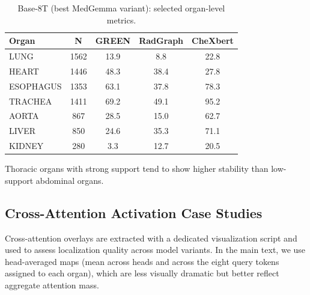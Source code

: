 \begin{table}[htbp]
    \centering
    \caption{Base-8T (best MedGemma variant): selected organ-level metrics.}
    \label{tab:best_model_organs}
    \begin{tabular}{lcccc}
        \toprule
        \textbf{Organ} & \textbf{N} & \textbf{GREEN} & \textbf{RadGraph} & \textbf{CheXbert} \\\midrule
        LUNG & 1562 & 13.9 & 8.8 & 22.8 \\
        HEART & 1446 & 48.3 & 38.4 & 27.8 \\
        ESOPHAGUS & 1353 & 63.1 & 37.8 & 78.3 \\
        TRACHEA & 1411 & 69.2 & 49.1 & 95.2 \\
        AORTA & 867 & 28.5 & 15.0 & 62.7 \\
        LIVER & 850 & 24.6 & 35.3 & 71.1 \\
        KIDNEY & 280 & 3.3 & 12.7 & 20.5 \\
        \bottomrule
    \end{tabular}
\end{table}

Thoracic organs with strong support tend to show higher stability than low-support abdominal organs.

\subsection{Cross-Attention Activation Case Studies}
Cross-attention overlays are extracted with a dedicated visualization script and used to assess localization quality across model variants. In the main text, we use head-averaged maps (mean across heads and across the eight query tokens assigned to each organ), which are less visually dramatic but better reflect aggregate attention mass.

